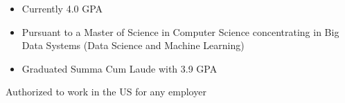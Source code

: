 \documentclass[10pt,a4paper,ragged2e,landscape]{altacv}
\begin{document}
\begin{itemize}
  \item Currently 4.0 GPA
  \item Pursuant to a Master of Science in Computer Science concentrating in Big Data
        Systems (Data Science and Machine Learning)
\end{itemize}
\divider
{}
\begin{itemize}
  \item  Graduated Summa Cum Laude with 3.9 GPA
\end{itemize}

\clearpage
\begin{minipage}[]{28cm}
  \begin{minipage}{9cm}
  \end{minipage}
  \hfill
  \begin{minipage}{9cm}
  \end{minipage}
  \hfill
  \begin{minipage}{9cm}
  \end{minipage}
  \begin{center}
    Authorized to work in the US for any employer
  \end{center}
\end{minipage}
\end{document}
